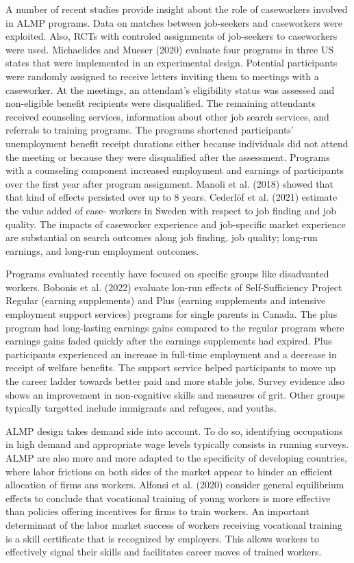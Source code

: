 \documentclass{article}
\begin{document}
A number of recent studies provide insight about the role of caseworkers involved in ALMP programs. Data on matches between job-seekers and caseworkers were exploited. Also, RCTs with controled assignments of job-seekers to caseworkers were used.  Michaelides and Mueser (2020) evaluate four
programs in three US states that were implemented in an experimental design.
Potential participants were randomly assigned to receive letters inviting them
to meetings with a caseworker. At the meetings, an attendant's eligibility status
was assessed and non-eligible benefit recipients were disqualified. The remaining attendants received counseling services, information about other job search services, and referrals to training
programs. The programs shortened participants' unemployment
benefit receipt durations either because individuals did not attend the meeting
or because they were disqualified after the assessment. Programs with a counseling component increased employment and earnings
of participants over the first year after program assignment. Manoli et al. (2018) showed that that kind of effects persisted over up to 8 years. Cederlöf et al. (2021) estimate the value added of case-
workers in Sweden with respect to job finding and job quality. The impacts of caseworker experience and job-specific market experience are substantial on search outcomes along job finding, job quality; long-run earnings, and long-run employment outcomes.

Programs evaluated recently have focused on specific groups like disadvanted workers. Bobonis et al. (2022) evaluate lon-run effects of Self-Sufficiency Project Regular (earning supplements) and Plus (earning supplements and intensive employment support services) programs for single parents in Canada. The plus program had long-lasting earnings gains compared to the
regular program where earnings gains faded quickly after the earnings supplements had expired. Plus participants experienced an increase in full-time employment and a decrease in receipt of welfare benefits. The support service helped participants to move up the career ladder towards better paid and more stable jobs. Survey evidence also shows an improvement in non-cognitive
skills and measures of grit. Other groups typically targetted include immigrants and refugees, and youths.

ALMP design takes demand side into account. To do so, identifying occupations in high demand and appropriate wage levels typically consists in running surveys. ALMP are also more and more adapted to the specificity of developing countries, where labor frictions on both sides of the market appear to hinder an efficient allocation of firms ans workers. Alfonsi et al. (2020) consider general equilibrium effects to conclude that vocational training of young workers is more effective than policies offering incentives for firms to train workers. An important determinant of the labor market success of workers receiving vocational training is a skill certificate
that is recognized by employers. This allows workers to effectively signal their
skills and facilitates career moves of trained workers.
\end{document}
